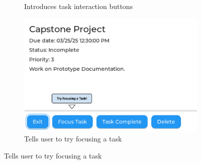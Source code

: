 \documentclass{article}
\begin{document}
\begin{figure}[h]
\begin{subfigure}{0.5\textwidth}
        \caption{Introduces task interaction buttons}
    \end{subfigure}
    \begin{subfigure}{0.5\textwidth}
        \includegraphics[width = \textwidth]{try_focus.png}
        \caption{Tells user to try focusing a task}
    \end{subfigure}
\end{figure}
\end{document}
